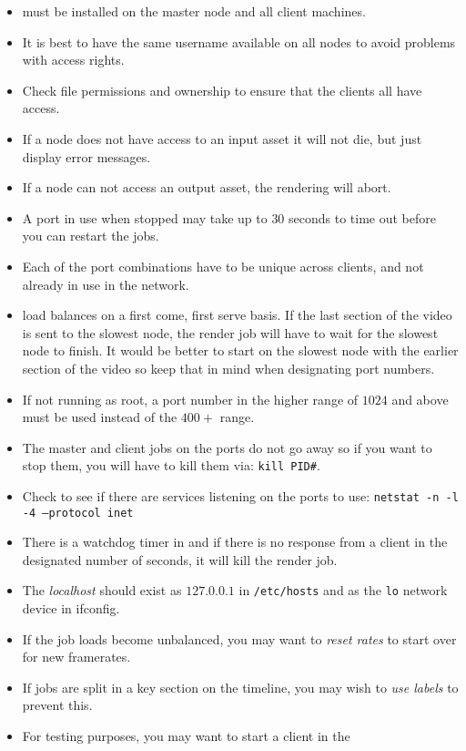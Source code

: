 \begin{itemize}
\item \CGG{} must be installed on the master node and all client
  machines.
\item It is best to have the same username available on all nodes to
  avoid problems with access rights.
\item Check file permissions and ownership to ensure that the
  clients all have access.
\item If a node does not have access to an input asset it will not
  die, but just display error messages.
\item If a node can not access an output asset, the rendering will
  abort.
\item A port in use when stopped may take up to $30$ seconds to time
  out before you can restart the jobs.
\item Each of the port combinations have to be unique across
  clients, and not already in use in the network.
\item \CGG{} load balances on a first come, first serve basis.  If
  the last section of the video is sent to the slowest node, the
  render job will have to wait for the slowest node to finish.  It
  would be better to start on the slowest node with the earlier
  section of the video so keep that in mind when designating port
  numbers.
\item If not running as root, a port number in the higher range of
  $1024$ and above must be used instead of the $400+$ range.
\item The master and client jobs on the ports do not go away so if
  you want to stop them, you will have to kill them via: \texttt{kill
    PID\#}.
\item Check to see if there are services listening on the ports to
  use: \texttt{netstat -n -l -4 --protocol inet}
\item There is a watchdog timer in \CGG{} and if there is no
  response from a client in the designated number of seconds, it will
  kill the render job.
\item The \textit{localhost} should exist as $127.0.0.1$ in
  \texttt{/etc/hosts} and as the \texttt{lo} network device in
  ifconfig.
\item If the job loads become unbalanced, you may want to
  \textit{reset rates} to start over for new framerates.
\item If jobs are split in a key section on the timeline, you may
  wish to \textit{use labels} to prevent this.
\item For testing purposes, you may want to start a client in the

\end{itemize}

